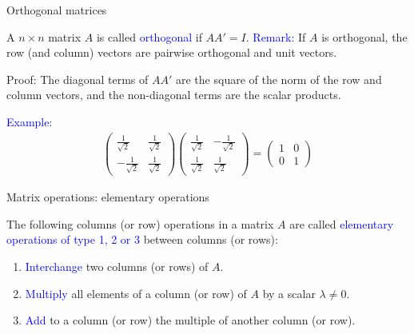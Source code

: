\documentclass[11pt,aspectratio=169]{beamer}
\begin{document}
\begin{frame}{Orthogonal matrices}

A $n \times n $ matrix $A$ is called \textcolor{blue}{orthogonal} if  $AA'=I$.
\vskip 12pt
\textcolor{blue}{Remark:} If $A$ is orthogonal, the row (and column) vectors are pairwise orthogonal and unit vectors.

\begin{tiny}Proof: The diagonal terms of $AA'$ are the square of the norm of the row and column vectors, and the non-diagonal  terms are the scalar products. \end{tiny}
\vskip 12pt
\textcolor{blue}{Example:}
\begin{align*}\begin{pmatrix}\frac{1}{\sqrt{2}}& \frac{1}{\sqrt{2}} \\
-\frac{1}{\sqrt{2}}& \frac{1}{\sqrt{2}}
\end{pmatrix} \begin{pmatrix}
\frac{1}{\sqrt{2}}& -\frac{1}{\sqrt{2}}\\
\frac{1}{\sqrt{2}}& \frac{1}{\sqrt{2}}
\end{pmatrix}=\begin{pmatrix}1&  0\\
0 & 1
\end{pmatrix}
\end{align*}
\end{frame}
\begin{frame}{Matrix operations: elementary operations}

The following columns (or row) operations in a matrix $A$ are called \textcolor{blue}{elementary operations of type 1, 2 or 3} between columns (or rows):

\begin{enumerate}


\item \textcolor{blue}{Interchange} two columns (or rows) of $A$.

\item \textcolor{blue}{Multiply} all elements of a column (or row) of $A$ by a scalar $\lambda \neq 0$.

\item \textcolor{blue}{Add} to a column (or row) the multiple of another column (or row).

\end{enumerate}\end{frame}
\end{document}
